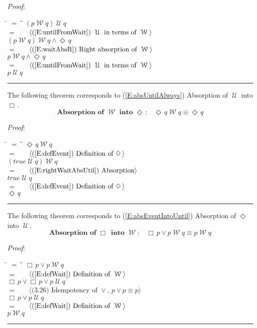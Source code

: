 \documentclass[12pt, fleqn, leqno]{article}
\newcommand{\lgap}{2pt}                             %
\newcommand{\mymathindent}{24pt}                    %
\newcommand{\Until}{\;\mathcal{U}\;}
\newcommand{\Wait}{\;\mathcal{W}\;}
\newcommand{\Event}{\Diamond\,}
\newcommand{\Always}{\Box\,}
\newcommand{\myqed}{\rule[-.23ex]{1.2ex}{2.0ex}}
\newcommand{\myqedtab}{\hspace{384pt}}              %
\newcommand{\Gll} {\langle}                         %
\newcommand{\Ggg} {\rangle}                         %
\newcommand{\Hint}[1]     {\ \ \ $\Gll              \mbox{#1} \Ggg$ }   %
\begin{document}
\emph{Proof}:
\begin{tabbing}
\hspace{\mymathindent} \= $= \;$ \= \myqedtab \= \kill
\> \> $(p \Wait q) \Until q$\\[\lgap]
\> $=$ \> \Hint{(\ref{E:untilFromWait}) $\Until$ in terms of $\Wait$} \\[\lgap]
\> \> $(p \Wait q) \Wait q \land \Event q$\\[\lgap]
\> $=$ \> \Hint{(\ref{E:waitAbsR}) Right absorption of $\Wait$} \\[\lgap]
\> \> $p \Wait q \land \Event q$\\[\lgap]
\> $=$ \> \Hint{(\ref{E:untilFromWait}) $\Until$ in terms of $\Wait$} \\[\lgap]
\> \> $p \Until q$ \quad \myqed
\end{tabbing}

The following theorem corresponds to (\ref{E:absUntilAlways}) Absorption of $\Until$ into $\Always$.
\begin{equation}\label{E:absorpEventWait}
\textbf{Absorption of $\Wait$ into $\Event$:}\quad \Event q \Wait q \equiv \Event q
\end{equation}

\emph{Proof}:
\begin{tabbing}
\hspace{\mymathindent} \= $= \;$ \= \myqedtab \= \kill
\> \> $\Event q \Wait q$\\[\lgap]
\> $=$  \>  \Hint{(\ref{E:defEvent}) Definition of $\Event$}\\[\lgap]
\> \> $(true\Until q) \Wait q$\\[\lgap]
\> $=$  \>  \Hint{(\ref{E:rightWaitAbsUtil}) Absorption}\\[\lgap]
\> \> $true\Until q$\\[\lgap]
\> $=$  \>  \Hint{(\ref{E:defEvent}) Definition of $\Event$}\\[\lgap]
\> \> $\Event q$ \quad \myqed
\end{tabbing}

The following theorem corresponds to (\ref{E:absEventIntoUntil}) Absorption of $\Event$ into $\Until$. 
\begin{equation}\label{E:absAlwaysWait}
\textbf{Absorption of $\Always$ into $\Wait$:}\quad \Always p\lor p\Wait q\equiv p\Wait q
\end{equation}

\emph{Proof}:
\begin{tabbing}
\hspace{\mymathindent} \= $= \;$ \= \myqedtab \= \kill
\> \> $\Always p\lor p\Wait q$\\[\lgap]
\> $=$ \> \Hint{(\ref{E:defWait}) Definition of $\Wait$} \\[\lgap]
\> \> $\Always p\lor \Always p\lor p\Until q$\\[\lgap]
\> $=$ \> \Hint{(3.26) Idempotency of $\lor$, $p \lor p \equiv p$} \\[\lgap]
\> \> $\Always p\lor p\Until q$\\[\lgap]
\> $=$ \> \Hint{(\ref{E:defWait}) Definition of $\Wait$} \\[\lgap]
\> \> $p\Wait q$ \quad \myqed
\end{tabbing}
\end{document}
